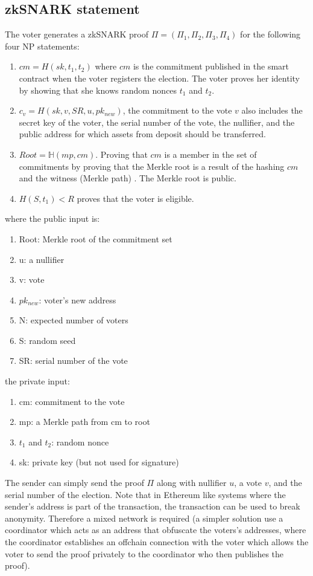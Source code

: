\documentclass[]{paper}
\begin{document}
\subsection{zkSNARK statement}
The voter generates a zkSNARK proof $\Pi = (\Pi_1,\Pi_2,\Pi_3,\Pi_4)$ for the following four NP statements:
\begin{enumerate}
	\item $cm = H(sk,t_1,t_2)$ where $cm$ is the commitment published in the smart contract when the voter registers the election. The voter proves her identity by showing that she knows random nonces $t_1$ and $t_2$. 
	\item $c_v= H(sk,v,SR,u,pk_{new})$, the commitment to the vote $v$ also includes the secret key of the voter, the serial number of the vote, the nullifier, and the public address for which assets from deposit should be transferred.
	\item $Root = \mathbb{H}(mp, cm)$. Proving that $cm$ is a member in the set of commitments by proving that the Merkle root is a result of the hashing $cm$ and the witness (Merkle path) . The Merkle root is public.
	\item $H(S,t_1)<R$ proves that the voter is eligible.
\end{enumerate}
where the public input is:
\begin{enumerate}
	\item Root: Merkle root of the commitment set
	\item u: a nullifier
	\item v: vote  
	\item $pk_{new}$: voter's new address
	\item N: expected number of voters
	\item S: random seed
	\item SR: serial number of the vote
\end{enumerate}	
the private input:
\begin{enumerate}
	\item cm: commitment to the vote
	\item mp: a Merkle path from cm to root
	\item $t_1$ and $t_2$: random nonce
	\item sk: private key (but not used for signature)
\end{enumerate}	
The sender can simply send the proof $\Pi$ along with nullifier $u$, a vote $v$, and the serial number of the election. Note that in Ethereum like systems where the sender's address is part of the transaction, the transaction can be used to break anonymity. Therefore a mixed network is required (a simpler solution use a coordinator which acts as an address that obfuscate the voters's addresses, where the coordinator establishes an offchain connection with the voter which allows the voter to send the proof privately to the coordinator who then publishes the proof).     
\end{document}
